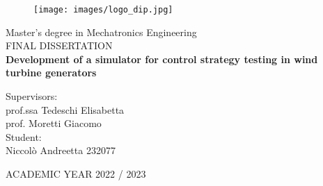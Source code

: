 \begin{figure}[H]
    \texttt{[image: images/logo\_dip.jpg]}
\end{figure}
\vspace{1.75cm}
\begin{center}
\huge
    Master's degree in Mechatronics Engineering\\ 
    \vspace{0.5 cm}
    FINAL DISSERTATION\\ 
    \vspace{1 cm}
    \textbf{Development of a simulator for control strategy testing in wind turbine generators}

\vspace{1.5 cm}

\normalsize
\end{center}
\Large
Supervisors: \\
prof.ssa Tedeschi Elisabetta\\ 
prof. Moretti Giacomo\\
Student:\\
Niccolò Andreetta 232077 \\ 

\vspace{0.5 cm}

\begin{center}
	ACADEMIC YEAR 2022 / 2023
\end{center}
\thispagestyle{empty}
\newpage



\newpage
\tableofcontents

\newpage
{} %
\printglossary[type=\acronymtype]
